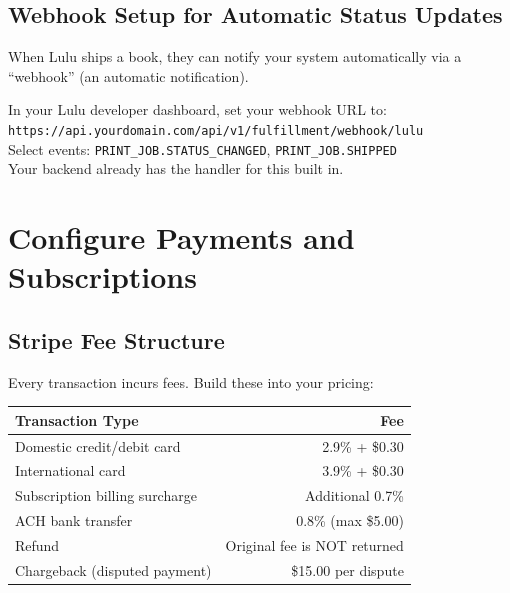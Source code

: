 \documentclass[12pt, letterpaper, oneside]{book}
\begin{document}
\section{Webhook Setup for Automatic Status Updates}

When Lulu ships a book, they can notify your system automatically via a ``webhook'' (an automatic notification).

\begin{actionbox}
In your Lulu developer dashboard, set your webhook URL to:\\[4pt]
\texttt{https://api.yourdomain.com/api/v1/fulfillment/webhook/lulu}\\[4pt]
Select events: \texttt{PRINT\_JOB.STATUS\_CHANGED}, \texttt{PRINT\_JOB.SHIPPED}\\[4pt]
Your backend already has the handler for this built in.
\end{actionbox}


\chapter{Configure Payments and Subscriptions}

\section{Stripe Fee Structure}

Every transaction incurs fees. Build these into your pricing:

\begin{table}[H]
\centering
\begin{tabularx}{\textwidth}{Xr}
\toprule
\textbf{Transaction Type} & \textbf{Fee} \\
\midrule
Domestic credit/debit card & 2.9\% + \$0.30 \\
International card & 3.9\% + \$0.30 \\
Subscription billing surcharge & Additional 0.7\% \\
ACH bank transfer & 0.8\% (max \$5.00) \\
Refund & Original fee is NOT returned \\
Chargeback (disputed payment) & \$15.00 per dispute \\
\bottomrule
\end{tabularx}
\end{table}
\end{document}
